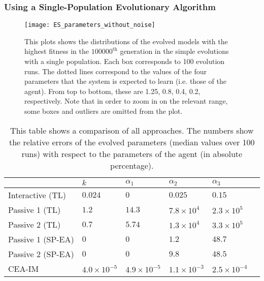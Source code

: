 \subsubsection{Using a Single-Population Evolutionary Algorithm}\label{sec:single_population_EA_deterministic_interaction}
\begin{figure}[!t]
	\centering
	\texttt{[image: ES\_parameters\_without\_noise]}
	\caption{This plots shows the distributions of the evolved models with the highest fitness in the $100000^\textrm{th}$ generation in the simple evolutions with a single population. Each box corresponds to 100 evolution runs. The dotted lines correspond to the values of the four parameters that the system is expected to learn (i.e. those of the agent). From top to bottom, these are 1.25, 0.8, 0.4, 0.2, respectively. Note that in order to zoom in on the relevant range, some boxes and outliers are omitted from the plot. \label{fig:evolution}}
\end{figure}

\begin{table}[!t] 
\caption{This table shows a comparison of all approaches. The numbers show the relative errors of the evolved parameters (median values over 100 runs) with respect to the parameters of the agent (in absolute percentage).} 
\renewcommand{\arraystretch}{1.1}
\centering %
\begin{tabular}{l l l l l l} %
\hline\hline  %
 & $k$ & $\alpha_1$ & $\alpha_2$ & $\alpha_3$ &  \\  
\hline   %
Interactive (TL) & $0.024$ & $0$ & $0.025$ & $0.15$\\ %
Passive 1 (TL) & $1.2$ & $14.3$ & $7.8\times10^4$ & $2.3\times10^5$\\ 
Passive 2 (TL) & $0.7$ & $5.74$ & $1.3\times10^4$ & $3.3\times10^5$\\ 
Passive 1 (SP-EA) & $0$ & $0$ & $1.2$ & $48.7$ \\ 
Passive 2 (SP-EA) & $0$ & $0$ & $9.8$ & $48.5$ \\  %
CEA-IM & $4.0\times10^{-5}$ & $4.9\times10^{-5}$ & $1.1\times10^{-3}$ & $2.5\times10^{-4}$ \\  %
\hline %
\end{tabular} 
\label{table:relative_accuracy} %
\end{table} 


